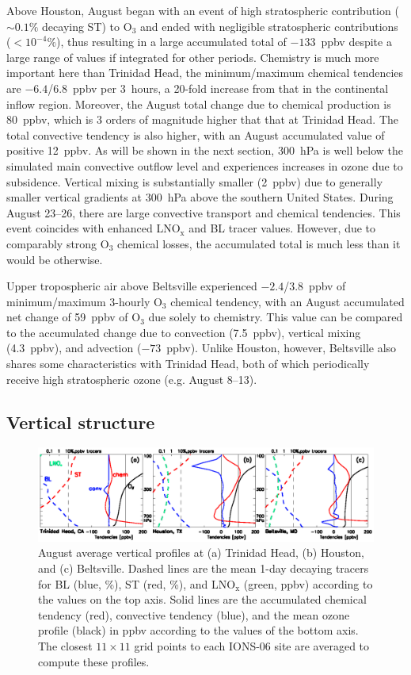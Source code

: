 Above Houston, August began with an event of high stratospheric contribution ($\sim0.1\%$ decaying ST) to O$_3$
and ended with negligible stratospheric contributions ($<10^{-4}\%$), thus resulting in a large accumulated total
of $-133$~ppbv despite a large range of values if integrated for other periods.
Chemistry is much more important here than Trinidad Head, the minimum/maximum chemical tendencies
are $-6.4$/6.8~ppbv per 3~hours, a 20-fold increase from that in the continental inflow region.
Moreover, the August total change due to chemical production is 80~ppbv, which is 3 orders
of magnitude higher that that at Trinidad Head. The total convective tendency is also higher, with an
August accumulated value of positive 12~ppbv.
As will be shown in the next section, 300~hPa is well below the simulated main convective outflow level
and experiences increases in ozone due to subsidence. Vertical mixing is substantially smaller (2~ppbv)
due to generally smaller vertical gradients at 300~hPa above the southern United States. During
August 23--26,  there are large convective transport and chemical tendencies. This event coincides with
enhanced LNO$_{\mathrm{x}}$ and BL tracer values. However, due to comparably strong
O$_3$ chemical losses, the accumulated total is much less than it would be otherwise.

Upper tropospheric air above Beltsville experienced $-2.4$/3.8~ppbv of minimum/maximum 3-hourly O$_3$ chemical
tendency, with an August accumulated net change of 59~ppbv of O$_3$ due solely to chemistry.
This value can be compared to the accumulated change due to convection
(7.5~ppbv), vertical mixing (4.3~ppbv), and advection ($-73$~ppbv). Unlike Houston, however,
Beltsville also shares some characteristics with Trinidad Head, both of which periodically
receive high stratospheric ozone (e.g. August 8--13).

\subsection{Vertical structure}
 \begin{figure}
 \noindent\includegraphics[width=40pc]{Figures/tendency_v.eps}
 \caption[August average mixing ratio and tracer vertical profiles]{\small
August average vertical profiles at (a) Trinidad Head, (b) Houston, and (c)
Beltsville. Dashed lines are the mean 1-day decaying tracers for BL (blue, \%),
ST (red, \%), and LNO$_{\mathrm{x}}$ (green, ppbv) according to the
values on the top axis. Solid lines are the accumulated chemical
tendency (red), convective tendency (blue), and the mean ozone profile
(black) in ppbv according to the values of the bottom axis. The closest
$11\times11$ grid points to each IONS-06 site are averaged to compute
these profiles.}
 \label{fig:tend_v}
 \end{figure}

